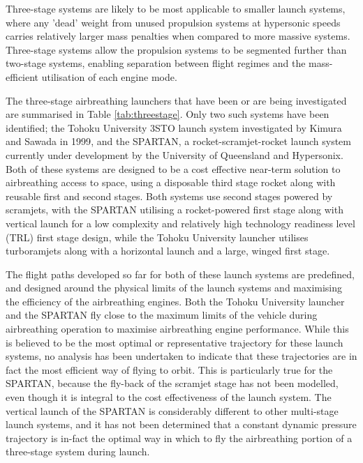 Three-stage systems are likely to be most applicable to smaller launch systems, where any 'dead' weight from unused propulsion systems at hypersonic speeds carries relatively larger mass penalties when compared to more massive systems. Three-stage systems allow the propulsion systems to be segmented further than two-stage systems, enabling separation between flight regimes and the mass-efficient utilisation of each engine mode\cite{Preller2017b}.

The three-stage airbreathing launchers that have been or are being investigated are summarised in Table \ref{tab:threestage}. Only two such systems have been identified; the Tohoku University 3STO launch system investigated by Kimura and Sawada in 1999\cite{Kimura1999}, and the SPARTAN, a rocket-scramjet-rocket launch system currently under development by the University of Queensland and Hypersonix\cite{Preller2017b,Hypersonix}. Both of these systems are designed to be a cost effective near-term solution to airbreathing access to space, using a disposable third stage rocket along with reusable first and second stages. Both systems use second stages powered by scramjets, with the SPARTAN utilising a rocket-powered first stage along with vertical launch for a low complexity and relatively high technology readiness level (TRL) first stage design, while the Tohoku University launcher utilises turboramjets along with a horizontal launch and a large, winged first stage\cite{Kimura1999}. 

 The flight paths developed so far for both of these launch systems are predefined, and designed around the physical limits of the launch systems and maximising the efficiency of the airbreathing engines. Both the Tohoku University launcher and the SPARTAN fly close to the maximum limits of the vehicle during airbreathing operation to maximise airbreathing engine performance\cite{Preller2017b,Kimura1999}.
While this is believed to be the most optimal or representative trajectory for these launch systems, no analysis has been undertaken to indicate that these trajectories are in fact the most efficient way of flying to orbit. This is particularly true for the SPARTAN, because the fly-back of the scramjet stage has not been modelled, even though it is integral to the cost effectiveness of the launch system\cite{Preller2017b}. 
The vertical launch of the SPARTAN is considerably different to other multi-stage launch systems, and it has not been determined that a constant dynamic pressure trajectory is in-fact the optimal way in which to fly the airbreathing portion of a three-stage system during launch. 


